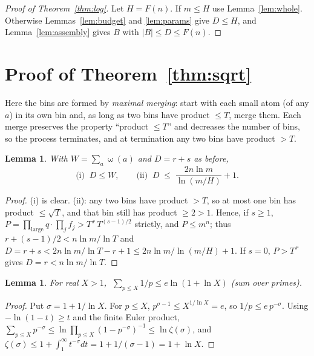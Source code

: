 \documentclass[11pt]{article}
\newtheorem{lemma}[theorem]{Lemma}
\theoremstyle{definition}
\DeclareMathOperator{\om}{\omega}
\begin{document}
\begin{proof}[Proof of Theorem~\ref{thm:log}]
Let $H=F(n)$. If $m\le H$ use Lemma~\ref{lem:whole}. Otherwise Lemmas~\ref{lem:budget} and \ref{lem:params}
give $D\le H$, and Lemma~\ref{lem:assembly} gives $B$ with $|B|\le D\le F(n)$.
\end{proof}

\section{Proof of Theorem~\ref{thm:sqrt}}\label{sec:sqrt}

Here the bins are formed by \emph{maximal merging}: start with each small atom (of any $a$) in its own bin
and, as long as two bins have product $\le T$, merge them. Each merge preserves the property ``product
$\le T$'' and decreases the number of bins, so the process terminates, and at termination any two bins have
product $>T$.

\begin{lemma}\label{lem:K}
With $W=\sum_a\om(a)$ and $D=r+s$ as before,
\[
 \text{(i)}\;\; D\le W,\qquad
 \text{(ii)}\;\; D\;\le\;\frac{2n\ln m}{\ln(m/H)}+1 .
\]
\end{lemma}
\begin{proof}
(i) is clear. (ii): any two bins have product $>T$, so at most one bin has product $\le\sqrt T$, and that bin still has
product $\ge 2>1$. Hence, if $s\ge 1$, $P=\prod_{\text{large}}q\cdot\prod_j f_j>T^{\,r}\,T^{(s-1)/2}$ strictly, and
$P\le m^n$; thus
$r+(s-1)/2<n\ln m/\ln T$ and $D=r+s<2n\ln m/\ln T-r+1\le 2n\ln m/\ln(m/H)+1$. If $s=0$, $P>T^{\,r}$ gives
$D=r<n\ln m/\ln T$.
\end{proof}

\begin{lemma}\label{lem:primesum}
For real $X>1$, $\;\sum_{p\le X}1/p\le e\ln(1+\ln X)$ (sum over primes).
\end{lemma}
\begin{proof}
Put $\sigma=1+1/\ln X$. For $p\le X$, $p^{\sigma-1}\le X^{1/\ln X}=e$, so $1/p\le e\,p^{-\sigma}$. Using
$-\ln(1-t)\ge t$ and the finite Euler product,
$\sum_{p\le X}p^{-\sigma}\le\ln\prod_{p\le X}(1-p^{-\sigma})^{-1}\le\ln\zeta(\sigma)$, and
$\zeta(\sigma)\le 1+\int_1^\infty t^{-\sigma}dt=1+1/(\sigma-1)=1+\ln X$.
\end{proof}
\end{document}
